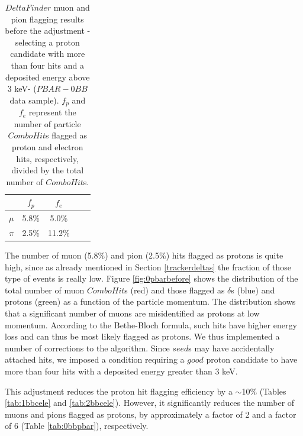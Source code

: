 \begin{center}
    \begin{table}[h!]
        \centering
        \renewcommand{\arraystretch}{1.}
        \begin{tabular}{| c | c | c | c | c|} 
        \hline
        &   $f_{p}$ &   $f_{e}$\\
        \hline
        $\mu$ &  5.8\%  & 5.0\%\\
        \hline
        $\pi$ & 2.5\% &  11.2\%\\
        \hline
        \end{tabular}
        \caption{
            $DeltaFinder$ muon 
        and pion flagging results before the 
        adjustment -selecting a proton 
        candidate with more than four hits 
        and a deposited energy above 3 keV- 
        ($PBAR-0BB$ data sample). $f_p$ and 
        $f_e$ represent 
        the number of particle $ComboHit$s 
        flagged as proton and electron hits, respectively, 
        divided by the total number of $ComboHit$s.}
        \label{tab:0bbpbarbefore}
    \end{table}
\end{center}

The number of muon (5.8\%) and pion (2.5\%) hits flagged as protons is quite high,
since as already mentioned in Section \ref{trackerdeltas} the fraction 
of those type of events is really low. 
Figure \ref{fig:0pbarbefore} shows the  
distribution of the total 
number of muon $ComboHit$s (red) 
and those flagged as $\delta$s (blue) 
and protons (green) as a function 
of the particle momentum. 
The distribution shows that a significant number of 
muons are misidentified 
as protons at low momentum. 
According to the Bethe-Bloch formula, 
such hits have 
higher energy loss and can thus be 
most likely flagged as 
protons. We thus implemented a 
number of corrections to the algorithm. 
Since $seed$s may have 
accidentally attached hits, we imposed a 
condition requiring a $good$ proton 
candidate to have more than four 
hits with a deposited energy greater than 3 keV.

This adjustment reduces the proton hit flagging  
efficiency by a $\sim$10\% 
(Tables \ref{tab:1bbcele} and \ref{tab:2bbcele}). 
However, it significantly reduces the 
number of muons and pions flagged as 
protons, by approximately 
a factor of 2 and a factor of 6 
(Table \ref{tab:0bbpbar}), respectively.

